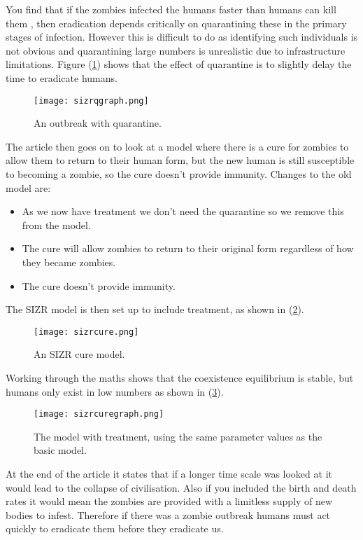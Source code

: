 \documentclass{mm2}
\begin{document}
\begin{enumerate}
	You find that if the zombies infected the humans faster than humans can kill them , then eradication depends critically on quarantining these in the primary stages of infection. However this is difficult to do as identifying such individuals is not obvious and quarantining large numbers is unrealistic due to infrastructure limitations. Figure (\ref{sizrqgraph}) shows that the effect of quarantine is to slightly delay  the time to eradicate humans.\newline
	\begin{figure}[ht]
		\centering
		\texttt{[image: sizrqgraph.png]}
		\caption{An outbreak with quarantine.}
		\label{sizrqgraph}
	\end{figure}
	\newpage
	The article then goes on to look at a model where there is a cure for zombies to allow them to return to their human form, but the new human is still susceptible to becoming a zombie, so the cure doesn't provide immunity. Changes to the old model are:
	\begin{itemize}
		\item As we now have treatment we don't need the quarantine so we remove this from the model.
		\item The cure will allow zombies to return to their original form regardless of how they became zombies.
		\item The cure doesn't provide immunity.
	\end{itemize}
	The SIZR model is then set up to include treatment,  as shown in (\ref{sizrcure}). \newline
	\begin{figure}[ht]
		\centering
		\texttt{[image: sizrcure.png]}
		\caption{An SIZR cure model.}
		\label{sizrcure}
	\end{figure}\newline
	Working through the maths shows that the coexistence equilibrium is stable, but humans only exist in low numbers as shown in (\ref{sizrcuregraph}).
	\begin{figure}[ht]
		\centering
		\texttt{[image: sizrcuregraph.png]}
		\caption{The model with treatment, using the same parameter values as the basic model.}
		\label{sizrcuregraph}
	\end{figure}\newline
	At the end of the article it states that if a longer time scale was looked at it would lead to the collapse of civilisation. Also if you included the birth and death rates it would mean the zombies are provided with a limitless supply of new bodies to infest. Therefore if there was a zombie outbreak humans must act quickly to eradicate them before they eradicate us.
\end{enumerate}
\end{document}
